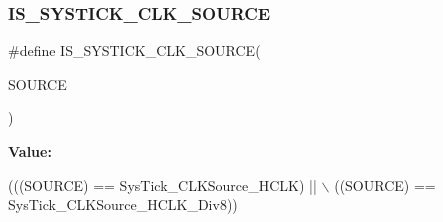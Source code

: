 \subsubsection{\texorpdfstring{I\+S\+\_\+\+S\+Y\+S\+T\+I\+C\+K\+\_\+\+C\+L\+K\+\_\+\+S\+O\+U\+R\+CE}{IS\_SYSTICK\_CLK\_SOURCE}}
{\footnotesize\ttfamily \#define I\+S\+\_\+\+S\+Y\+S\+T\+I\+C\+K\+\_\+\+C\+L\+K\+\_\+\+S\+O\+U\+R\+CE(\begin{DoxyParamCaption}\item[{}]{S\+O\+U\+R\+CE }\end{DoxyParamCaption})}

{\bfseries Value\+:}
\begin{DoxyCode}
(((SOURCE) == SysTick\_CLKSource\_HCLK) || \(\backslash\)
                                       ((SOURCE) == SysTick\_CLKSource\_HCLK\_Div8))
\end{DoxyCode}
